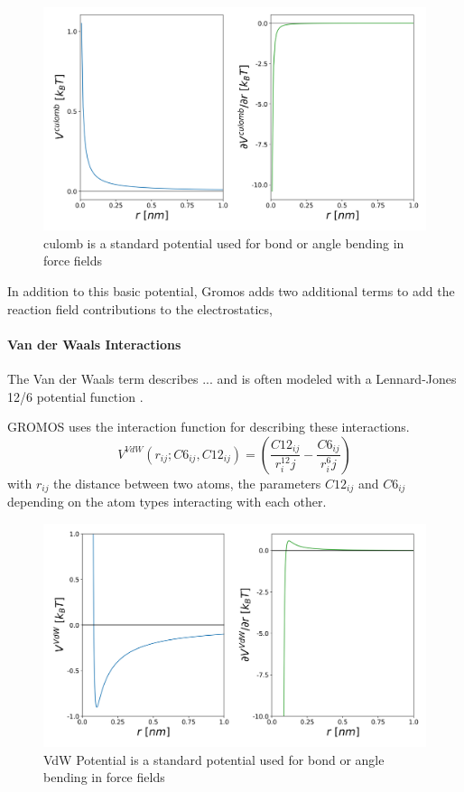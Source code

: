 \begin{figure}[h]
    \centering
    \includegraphics[width=\textwidth]{fig/ForceField/culomb.png}
    \caption{culomb is a standard potential used for bond or angle bending in force fields}
    \label{fig:culomb}
\end{figure}

In addition to this basic potential, Gromos adds two additional terms to add the reaction field contributions to the electrostatics, \cite{Tironi1995}

\paragraph{Van der Waals Interactions}
The Van der Waals term describes  ... and is often modeled with a Lennard-Jones 12/6 potential function \cite{Jones1924}.

GROMOS uses the  interaction function for describing these interactions. 
\begin{equation}
    V^{VdW}(r_{ij}; C6_{ij}, C12_{ij}) = (\frac{C12_{ij}}{r^{12}_ij}-\frac{C6_{ij}}{r^{6}_ij}) 
\end{equation}
with $r_{ij}$ the distance between two atoms, the parameters $C12_{ij}$ and $C6_{ij}$ depending on the atom types interacting with each other.
\begin{figure}[h]
    \centering
    \includegraphics[width=\textwidth]{fig/ForceField/vdw.png}
    \caption{VdW Potential is a standard potential used for bond or angle bending in force fields}
    \label{fig:VdW}
\end{figure}




